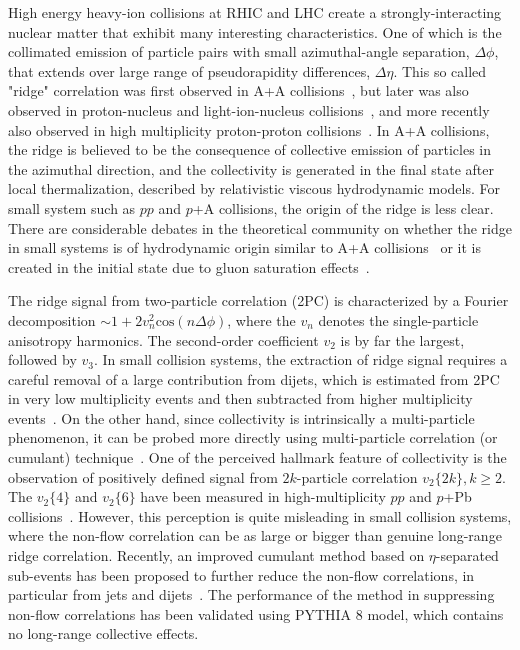 High energy heavy-ion collisions at RHIC and LHC create a strongly-interacting nuclear matter that exhibit many interesting characteristics. One of which is the collimated emission of particle pairs with small azimuthal-angle separation, $\Delta\phi$, that extends over large range of pseudorapidity differences, $\Delta\eta$. This so called "ridge" correlation was first observed in A+A collisions~\cite{Adare:2008ae, Abelev:2009af, Alver:2009id, ALICE:2011ab, Aad:2012bu, Chatrchyan:2013kba}, but later was also observed in proton-nucleus and light-ion-nucleus collisions~\cite{CMS:2012qk, Abelev:2012ola, Aad:2012gla, Adare:2013piz, Aad:2014lta, Khachatryan:2015waa}, and more recently also observed in high multiplicity proton-proton collisions~\cite{Khachatryan:2010gv, Aad:2015gqa, Aaboud:2016yar, atlas:4}. In A+A collisions, the ridge is believed to be the consequence of collective emission of particles in the azimuthal direction, and the collectivity is generated in the final state after local thermalization, described by relativistic viscous hydrodynamic models. For small system such as $pp$ and $p$+A collisions, the origin of the ridge is less clear. There are considerable debates in the theoretical community on whether the ridge in small systems is of hydrodynamic origin similar to A+A collisions~\cite{Bozek:2013uha} or it is created in the initial state due to gluon saturation effects~\cite{Dusling:2013qoz}.

The ridge signal from two-particle correlation (2PC) is characterized by a Fourier decomposition $\sim 1+2 v_{n}^{2}\text{cos}(n\Delta\phi)$, where the $v_{n}$ denotes the single-particle anisotropy harmonics. The second-order coefficient $v_{2}$ is by far the largest, followed by $v_{3}$. In small collision systems, the extraction of ridge signal requires a careful removal of a large contribution from dijets, which is estimated from 2PC in very low multiplicity events and then subtracted from higher multiplicity events~\cite{Abelev:2012ola, Aad:2012gla, Aad:2014lta, Aad:2015gqa, Aaboud:2016yar, Khachatryan:2016txc}. On the other hand, since collectivity is intrinsically a multi-particle phenomenon, it can be probed more directly using multi-particle correlation (or cumulant) technique~\cite{Borghini:2000sa}. One of the perceived hallmark feature of collectivity is the observation of positively defined signal from $2k$-particle correlation $v_{2}\{2k\},k\ge 2$. The $v_{2}\{4\}$ and $v_{2}\{6\}$ have been measured in high-multiplicity $pp$ and $p$+Pb collisions~\cite{Khachatryan:2015waa, atlas:4, Khachatryan:2016txc, Aad:2013fja}. However, this perception is quite misleading in small collision systems, where the non-flow correlation can be as large or bigger than genuine long-range ridge correlation. Recently, an improved cumulant method based on $\eta$-separated sub-events has been proposed to further reduce the non-flow correlations, in particular from jets  and dijets~\cite{jjia}. The performance of the method in suppressing non-flow correlations has been validated using PYTHIA 8 model, which contains no long-range collective effects.

